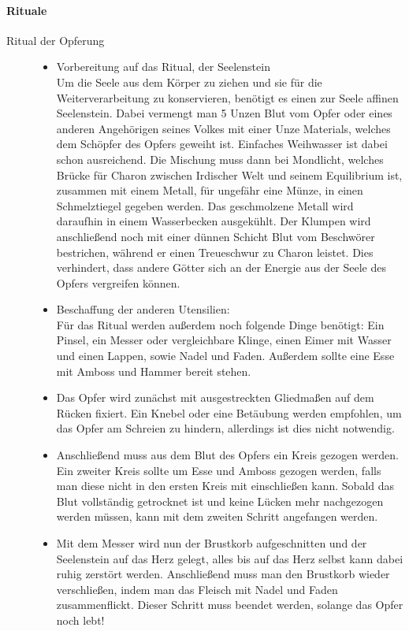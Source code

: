 \documentclass[a4paper,12pt,oneside]{book}
\begin{document}
\paragraph{Rituale}
\begin{description}
\item[Ritual der Opferung]\label{Nekromantie:Ritual der Opferung}
\begin{itemize}
\item Vorbereitung auf das Ritual, der Seelenstein
\\Um die Seele aus dem Körper zu ziehen und sie für die Weiterverarbeitung zu konservieren, benötigt es einen zur Seele affinen Seelenstein. Dabei vermengt man 5 Unzen Blut vom Opfer oder eines anderen Angehörigen seines Volkes mit einer Unze Materials, welches dem Schöpfer des Opfers geweiht ist. Einfaches Weihwasser ist dabei schon ausreichend. Die Mischung muss dann bei Mondlicht, welches Brücke für Charon zwischen Irdischer Welt und seinem Equilibrium ist, zusammen mit einem Metall, für ungefähr eine Münze, in einen Schmelztiegel gegeben werden. Das geschmolzene Metall wird daraufhin in einem Wasserbecken ausgekühlt. Der Klumpen wird anschließend noch mit einer dünnen Schicht Blut vom Beschwörer bestrichen, während er einen Treueschwur zu Charon leistet. Dies verhindert, dass andere Götter sich an der Energie aus der Seele des Opfers vergreifen können. 
\item Beschaffung der anderen Utensilien:
\\Für das Ritual werden außerdem noch folgende Dinge benötigt: Ein Pinsel, ein Messer oder vergleichbare Klinge, einen Eimer mit Wasser und einen Lappen, sowie Nadel und Faden. Außerdem sollte eine Esse mit Amboss und Hammer bereit stehen.
\item Das Opfer wird zunächst mit ausgestreckten Gliedmaßen auf dem Rücken fixiert. Ein Knebel oder eine Betäubung werden empfohlen, um das Opfer am Schreien zu hindern, allerdings ist dies nicht notwendig.
\item Anschließend muss aus dem Blut des Opfers ein Kreis gezogen werden. Ein zweiter Kreis sollte um Esse und Amboss gezogen werden, falls man diese nicht in den ersten Kreis mit einschließen kann. Sobald das Blut vollständig getrocknet ist und keine Lücken  mehr nachgezogen werden müssen, kann mit dem zweiten Schritt angefangen werden.
\item Mit dem Messer wird nun der Brustkorb aufgeschnitten und der Seelenstein auf das Herz gelegt, alles bis auf das Herz selbst kann dabei ruhig zerstört werden. Anschließend muss man den Brustkorb wieder verschließen, indem man das Fleisch mit Nadel und Faden zusammenflickt. Dieser Schritt muss beendet werden, solange das Opfer noch lebt!

\end{itemize}
\end{description}
\end{document}
